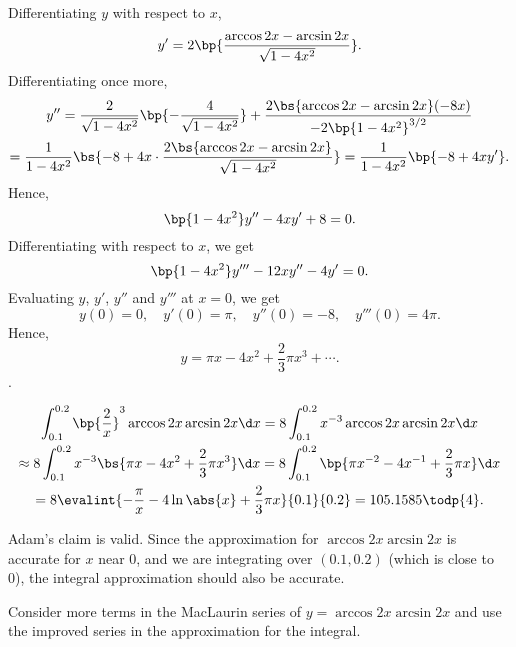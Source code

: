 \begin{solution}
    \begin{ppart}
        Differentiating $y$ with respect to $x$, \[y' = 2 \bp{\frac{\arccos{2x} - \arcsin{2x}}{\sqrt{1-4x^2}}}.\] Differentiating once more, 
        \begin{gather*}
            y'' = \frac{2}{\sqrt{1-4x^2}} \bp{-\frac{4}{\sqrt{1-4x^2}}} + \frac{2\bs{\arccos{2x} - \arcsin{2x}}  (-8x)}{-2 \bp{1-4x^2}^{3/2}} \\
            = \frac1{1 - 4x^2} \bs{-8 + 4x \cdot \frac{2\bs{\arccos{2x} - \arcsin{2x}}}{\sqrt{1-4x^2}}} = \frac1{1-4x^2} \bp{-8 + 4xy'}.
        \end{gather*}
        Hence, \[\bp{1-4x^2} y'' - 4xy' + 8 = 0.\] Differentiating with respect to $x$, we get \[\bp{1-4x^2} y''' - 12xy'' - 4y' = 0.\] Evaluating $y$, $y'$, $y''$ and $y'''$ at $x = 0$, we get \[y(0) = 0, \quad y'(0) = \pi, \quad y''(0) = -8, \quad y'''(0) = 4\pi.\] Hence, \[y = \pi x - 4x^2 + \frac23 \pi x^3 + \cdots.\].
    \end{ppart}
    \begin{ppart}
        \begin{gather*}
            \int_{0.1}^{0.2} \bp{\frac2x}^3 \arccos{2x}\arcsin{2x} \d x = 8 \int_{0.1}^{0.2} x^{-3} \arccos{2x}\arcsin{2x} \d x\\
            \approx 8 \int_{0.1}^{0.2} x^{-3} \bs{\pi x - 4x^2 + \frac23 \pi x^3} \d x = 8 \int_{0.1}^{0.2} \bp{\pi x^{-2} - 4x^{-1} + \frac23 \pi x} \d x\\
            = 8 \evalint{-\frac\pi{x} - 4\ln\abs{x} + \frac23 \pi x}{0.1}{0.2} = 105.1585 \todp{4}.
        \end{gather*}
    \end{ppart}
    \begin{ppart}
        Adam's claim is valid. Since the approximation for $\arccos{2x}\arcsin{2x}$ is accurate for $x$ near 0, and we are integrating over $(0.1, 0.2)$ (which is close to 0), the integral approximation should also be accurate.
    \end{ppart}
    \begin{ppart}
        Consider more terms in the MacLaurin series of $y = \arccos{2x}\arcsin{2x}$ and use the improved series in the approximation for the integral.
    \end{ppart}
\end{solution}

